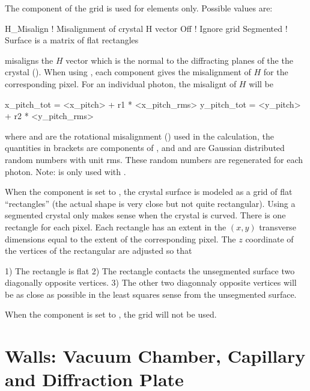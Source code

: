 The  component of the grid is used for
 elements only. Possible  values are:
\begin{example}
  H_Misalign         ! Misalignment of crystal H vector
  Off                ! Ignore grid
  Segmented          ! Surface is a matrix of flat rectangles
\end{example}
 misaligns the $H$ vector which is the normal to the
diffracting planes of the the crystal ().
When using , each  component gives the
misalignment of $H$ for the corresponding pixel. For an individual
photon, the misalignt of $H$ will be
\begin{example}
  x_pitch_tot = <x_pitch> + r1 * <x_pitch_rms>
  y_pitch_tot = <y_pitch> + r2 * <y_pitch_rms>
\end{example}
where  and  are the rotational
misalignment () used in the calculation, the quantities
in brackets  are components of , and  and
 are Gaussian distributed random numbers with unit rms. These
random numbers are regenerated for each photon. Note:  is only
used with .

When the  component is set to , the crystal
surface is modeled as a grid of flat ``rectangles'' (the actual shape
is very close but not quite rectangular). Using a segmented crystal
only makes sense when the crystal is curved. There is one rectangle
for each pixel. Each rectangle has an extent in the $(x,y)$ transverse
dimensions equal to the extent of the corresponding pixel. The $z$
coordinate of the vertices of the rectangular are adjusted so that 
\begin{example}
  1) The rectangle is flat
  2) The rectangle contacts the unsegmented surface two diagonally opposite vertices.
  3) The other two diagonnaly opposite vertices will be as close as possible in the
     least squares sense from the unsegmented surface.
\end{example}

When the  component is set to , the grid will not be used.

\section{Walls: Vacuum Chamber, Capillary and Diffraction Plate}
\label{s:wall}

